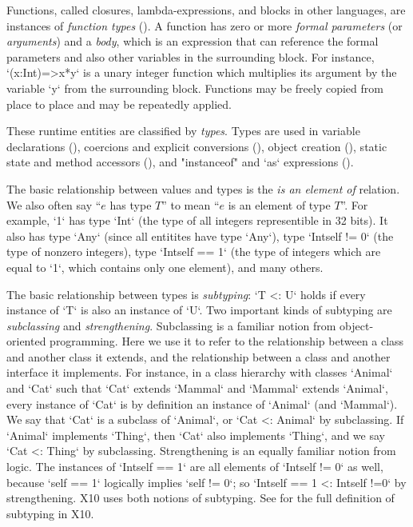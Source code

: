Functions, called closures, lambda-expressions, and blocks in other languages, are
instances of {\em function types} (). 
A function has zero or more {\em formal parameters} (or {\em arguments}) and a
{\em body}, which is 
an expression that can reference the formal parameters and also other
variables in the surrounding block. For instance, \xcd`(x:Int)=>x*y`
is a unary integer function which multiplies its argument by the
variable \xcd`y` from the surrounding block.  Functions may be freely
copied from place to place and may be repeatedly applied. 

These runtime entities are classified by {\em types}. Types are used in
variable declarations (), coercions and  explicit
conversions (), object creation (),
static state and method accessors (), and
\xcd"instanceof" and \xcd`as` expressions ().


The basic relationship between values and types is the {\em is an
element of} relation.  We also often say ``$e$ has type $T$'' to
mean ``$e$ is an element of type $T$''.  For example, \xcd`1` has type
\xcd`Int` (the type of all integers representible in 32 bits). It also
has type \xcd`Any` (since all entitites have type \xcd`Any`), type
\xcd`Int{self != 0}` (the type of nonzero integers), type
\xcd`Int{self == 1}` (the type of integers which are equal to \xcd`1`, which
contains only one element), and many others. 

The basic relationship between types is {\em subtyping}: \xcd`T <: U`
holds if every instance of \xcd`T` is also an instance of \xcd`U`. Two
important kinds of subtyping are {\em subclassing} and {\em
  strengthening}. Subclassing is a familiar notion from
object-oriented programming. Here we use it to refer to the
relationship between a class and another class it extends, and the
relationship between a class and another interface it implements. For
instance, in a class hierarchy with classes \xcd`Animal` and \xcd`Cat`
such that \xcd`Cat` extends \xcd`Mammal` and \xcd`Mammal` extends
\xcd`Animal`, every instance of \xcd`Cat` is by definition an instance
of \xcd`Animal` (and \xcd`Mammal`). We say that \xcd`Cat` is a
subclass of \xcd`Animal`, or \xcd`Cat <: Animal` by subclassing. If
\xcd`Animal` implements \xcd`Thing`, then \xcd`Cat` also implements
\xcd`Thing`, and we say \xcd`Cat <: Thing` by subclassing.
Strengthening is an equally familiar notion from logic.  The instances
of \xcd`Int{self == 1}` are all elements of \xcd`Int{self != 0}` as well,
because \xcd`self == 1` logically implies \xcd`self != 0`; so 
\xcd`Int{self  == 1} <: Int{self !=0}` by strengthening.  X10 uses both notions
of subtyping.  See  for the full definition
of subtyping in X10.

